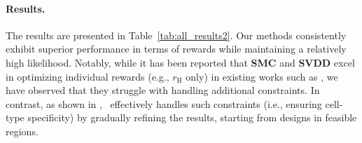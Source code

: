 \vspace{-2mm}
\paragraph{Results.} The results are presented in Table~\ref{tab:all_results2}. Our methods consistently exhibit superior performance in terms of rewards while maintaining a relatively high likelihood. Notably, while it has been reported that \textbf{SMC} and \textbf{SVDD} excel in optimizing individual rewards (e.g., $r_{\mathrm{H}}$ only) in existing works such as \citet{li2024derivative}, we have observed that they struggle with handling additional constraints. In contrast, as shown in , \alg\, effectively handles such constraints (i.e., ensuring cell-type specificity) by gradually refining the results, starting from designs in feasible regions. 


